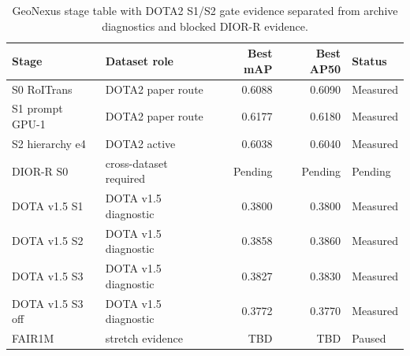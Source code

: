 \begin{table}[t]
\centering
\small
\caption{GeoNexus stage table with DOTA2 S1/S2 gate evidence separated from archive diagnostics and blocked DIOR-R evidence.}
\label{tab:geonexus_stage_ablation}
\begin{tabular}{llrrl}
\toprule
Stage & Dataset role & Best mAP & Best AP50 & Status \\
\midrule
S0 RoITrans & DOTA2 paper route & 0.6088 & 0.6090 & Measured \\
S1 prompt GPU-1 & DOTA2 paper route & 0.6177 & 0.6180 & Measured \\
S2 hierarchy e4 & DOTA2 active & 0.6038 & 0.6040 & Measured \\
DIOR-R S0 & cross-dataset required & Pending & Pending & Pending \\
DOTA v1.5 S1 & DOTA v1.5 diagnostic & 0.3800 & 0.3800 & Measured \\
DOTA v1.5 S2 & DOTA v1.5 diagnostic & 0.3858 & 0.3860 & Measured \\
DOTA v1.5 S3 & DOTA v1.5 diagnostic & 0.3827 & 0.3830 & Measured \\
DOTA v1.5 S3 off & DOTA v1.5 diagnostic & 0.3772 & 0.3770 & Measured \\
FAIR1M & stretch evidence & TBD & TBD & Paused \\
\bottomrule
\end{tabular}
\end{table}
